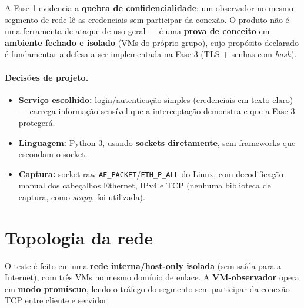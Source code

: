 \documentclass[11pt,a4paper]{article}
\begin{document}
A Fase 1 evidencia a \textbf{quebra de confidencialidade}: um observador no mesmo
segmento de rede lê as credenciais sem participar da conexão. O produto não é uma
ferramenta de ataque de uso geral — é uma \textbf{prova de conceito} em
\textbf{ambiente fechado e isolado} (VMs do próprio grupo), cujo propósito
declarado é fundamentar a defesa a ser implementada na Fase 3 (TLS + senhas com
\textit{hash}).

\paragraph{Decisões de projeto.}
\begin{itemize}[nosep]
  \item \textbf{Serviço escolhido:} login/autenticação simples (credenciais em
        texto claro) — carrega informação sensível que a interceptação demonstra
        e que a Fase 3 protegerá.
  \item \textbf{Linguagem:} Python 3, usando \textbf{sockets diretamente}, sem
        frameworks que escondam o socket.
  \item \textbf{Captura:} socket raw \texttt{AF\_PACKET}/\texttt{ETH\_P\_ALL} do
        Linux, com decodificação manual dos cabeçalhos Ethernet, IPv4 e TCP
        (nenhuma biblioteca de captura, como \textit{scapy}, foi utilizada).
\end{itemize}

\section{Topologia da rede}

O teste é feito em uma \textbf{rede interna/host-only isolada} (sem saída para a
Internet), com três VMs no mesmo domínio de enlace. A \textbf{VM-observador}
opera em \textbf{modo promíscuo}, lendo o tráfego do segmento sem participar da
conexão TCP entre cliente e servidor.
\end{document}
